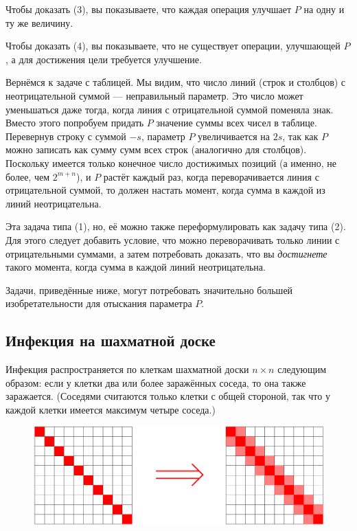 Чтобы доказать (3), вы показываете, что каждая операция улучшает $P$ на одну и ту же величину.

Чтобы доказать (4), вы показываете, что не существует операции, улучшающей $P$, а для достижения цели требуется улучшение.

\smallskip

Вернёмся к задаче с таблицей.
Мы видим, что число линий (строк и столбцов) с неотрицательной суммой --- неправильный параметр.
Это число может уменьшаться даже тогда, когда линия с отрицательной суммой поменяла знак.
Вместо этого попробуем придать $P$ значение суммы всех чисел в таблице.
Перевернув строку с суммой $-s$, параметр $P$ увеличивается на $2s$, так как $P$ можно записать как сумму сумм всех строк (аналогично для столбцов).
Поскольку имеется только конечное число достижимых позиций
(а именно, не более, чем $2^{m+n}$), и $P$ растёт каждый раз, когда переворачивается линия с отрицательной суммой, то должен настать момент, когда сумма в каждой из линий неотрицательна.

Эта задача типа (1), но, её можно также переформулировать как задачу типа (2).
Для этого следует добавить условие, что можно переворачивать только линии с отрицательными суммами, а затем потребовать доказать, что вы \emph{достигнете} такого момента, когда сумма в каждой линий неотрицательна.

\medskip

Задачи, приведённые ниже, могут потребовать значительно большей изобретательности для отыскания параметра $P$.

\subsection*{Инфекция на шахматной доске}%

Инфекция распространяется по клеткам шахматной доски $n \times n$ следующим образом: если у клетки два или более заражённых соседа, то она также заражается.
(Соседями считаются только клетки с общей стороной, так что у каждой клетки имеется максимум четыре соседа.)

\begin{figure}[h!]
\centering
\includegraphics[scale=0.6]{Figs/Algorithms/diag}
\end{figure}

